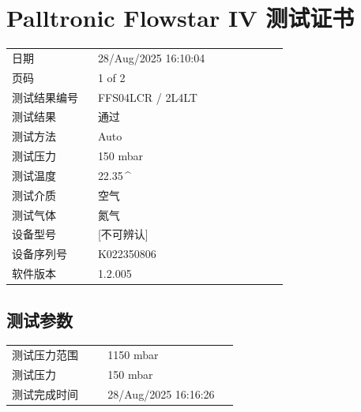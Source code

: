 \documentclass[UTF8,10pt,a4paper,fontset=fandol]{ctexart}
\newcommand{\fieldvalue}[1]{#1}
\begin{document}
\section{Palltronic Flowstar IV 测试证书}

\begin{tabular}{@{}p{0.28\linewidth}p{0.62\linewidth}@{}}
日期 &
\fieldvalue{28/Aug/2025 16:10:04}
\\
页码 &
\fieldvalue{1 of 2}
\\
测试结果编号 &
\fieldvalue{FFS04LCR / 2L4LT}
\\
测试结果 &
\fieldvalue{通过}
\\
测试方法 &
\fieldvalue{Auto}
\\
测试压力 &
\fieldvalue{150 mbar}
\\
测试温度 &
\fieldvalue{22.35\,^{\circ}\mathrm{C}}
\\
测试介质 &
\fieldvalue{空气}
\\
测试气体 &
\fieldvalue{氮气}
\\
设备型号 &
\fieldvalue{[不可辨认]}
\\
设备序列号 &
\fieldvalue{K022350806}
\\
软件版本 &
\fieldvalue{1.2.005}
\\
\end{tabular}


\subsection{测试参数}

\begin{tabular}{@{}p{0.38\linewidth}p{0.52\linewidth}@{}}
测试压力范围 &
\fieldvalue{1150 mbar}
\\
测试压力 &
\fieldvalue{150 mbar}
\\
测试完成时间 &
\fieldvalue{28/Aug/2025 16:16:26}
\\
\end{tabular}
\end{document}
